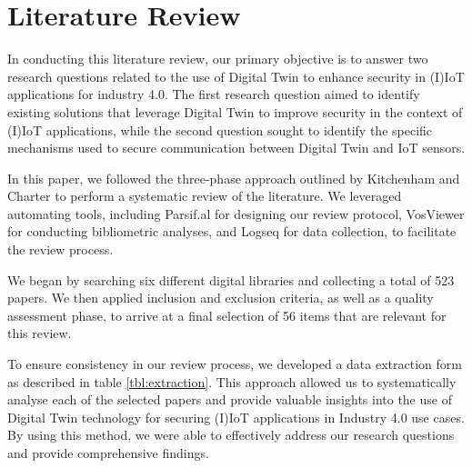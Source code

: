                 

\chapter{Literature Review} 
\label{Chapter3} %
In conducting this literature review, our primary objective is to answer two research questions related to the use of Digital Twin to enhance security in (I)IoT applications for industry 4.0. The first research question aimed to identify existing solutions that leverage Digital Twin to improve security in the context of (I)IoT applications, while the second question sought to identify the specific mechanisms used to secure communication between Digital Twin and IoT sensors.

In this paper, we followed the three-phase approach outlined by Kitchenham and Charter\cite{kitchenham_guidelines_2007} to perform a systematic review of the literature. We leveraged automating tools, including Parsif.al for designing our review protocol, VosViewer for conducting bibliometric analyses, and Logseq for data collection, to facilitate the review process.

We began by searching six different digital libraries and collecting a total of 523 papers. We then applied inclusion and exclusion criteria, as well as a quality assessment phase, to arrive at a final selection of 56 items that are relevant for this review.

To ensure consistency in our review process, we developed a data extraction form as described in table \ref{tbl:extraction}. This approach allowed us to systematically analyse each of the selected papers and provide valuable insights into the use of Digital Twin technology for securing (I)IoT applications in Industry 4.0 use cases. By using this method, we were able to effectively address our research questions and provide comprehensive findings.










